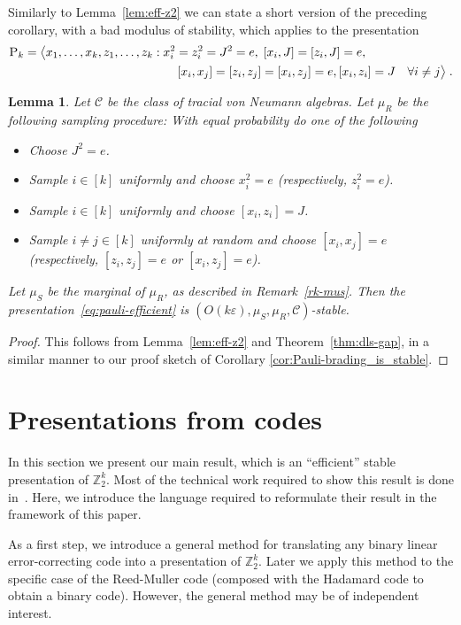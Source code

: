 \documentclass[11pt]{article}
\newtheorem{lemma}[theorem]{Lemma}
\theoremstyle{definition}
\newcommand{\Z}{\ensuremath{\mathbb{Z}}}
\newcommand{\mC}{\ensuremath{\mathcal{C}}}
\newcommand{\eps}{\varepsilon}
\newcommand{\gamestyle}[1]{\ensuremath{\textsc{#1}}\xspace}
\newcommand{\pauli}{\gamestyle{P}}
\begin{document}
Similarly to Lemma~\ref{lem:eff-z2} we can state a short version of the preceding corollary, with a bad modulus of stability, which applies to the presentation
\begin{align}
 \pauli_k = \big\langle x_1,\ldots,x_k,z_1,\ldots,z_k &: x_i^2=z_i^2=J^2=e,\; [x_i,J]=[z_i,J]=e,\notag\\
&\qquad  [x_i,x_j]=[z_i,z_j]=[x_i,z_j]=e, [x_i,z_i]=J \quad \forall i\neq j \big\rangle\;.\label{eq:pauli-efficient}
\end{align}

\begin{lemma}\label{lem:eff-pauli}
  Let $\mC$ be the class of tracial von Neumann algebras. Let $\mu_R$ be the following sampling procedure: With equal probability do one of the following
  \begin{itemize}
      \item Choose $J^2=e$.
      \item Sample $i\in [k]$ uniformly and choose $x_i^2=e$ (respectively, $z_i^2=e$).
      \item Sample $i\in [k]$ uniformly and choose $[x_i,z_i]=J$.
      \item Sample $i\neq j\in [k]$ uniformly at random and choose $[x_i,x_j]=e$ (respectively, $[z_i,z_j]=e$ or $[x_i,z_j]=e$).
  \end{itemize}
  Let $\mu_S$ be the marginal of $\mu_R$, as described in Remark~\ref{rk-mus}. Then 
 the presentation~\eqref{eq:pauli-efficient} is $(O(k\eps),\mu_S,\mu_R,\mC)$-stable.
\end{lemma}

\begin{proof}
This follows from Lemma~\ref{lem:eff-z2} and Theorem~\ref{thm:dls-gap}, in a similar manner to our proof sketch of Corollary \ref{cor:Pauli-brading_is_stable}.
\end{proof}

\section{Presentations from codes}
\label{sec:pres-codes}

In this section we present our main result, which is an ``efficient'' stable presentation of $\Z_2^k$. Most of the technical work required to show this result is done in~\cite{ji2020mip}. Here, we introduce the language required to reformulate their result in the framework of this paper. 

As a first step, we introduce a general method for translating any binary linear error-correcting code into a presentation of $\Z_2^k$. Later we apply this method to the specific case of the Reed-Muller code (composed with the Hadamard code to obtain a binary code). However, the general method may be of independent interest. 
\end{document}
